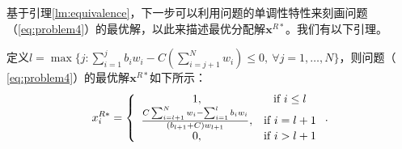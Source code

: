 	基于引理\ref{lm:equivalence}，下一步可以利用问题的单调性特性来刻画问题（\ref{eq:problem4}）的最优解，以此来描述最优分配解$\mathbf{x}^{R*}$。我们有以下引理。
	\begin{lm}\label{lm:optx}
		定义$l=\max\{j:\sum_{i=1}^{j}b_iw_i-C(\sum_{i=j+1}^{N}w_i)\le 0,~\forall j=1,\dots,N\}$，则问题（ \ref{eq:problem4}）的最优解$\mathbf{x}^{R*}$如下所示：
		\begin{equation}\label{eq:xR}
		x_i^{R*}=\left\{
		\begin{array}{*{20}c}
		1, & \text{if}~i\le l  \\
		\frac{C\sum_{i=l+1}^N w_i-\sum_{i=1}^l b_iw_i}{(b_{l+1}+C)w_{l+1}}, & {\text{if}~i=l+1}  \\
		0, & \text{if}~i>l+1
		\end{array} \right..
		\end{equation}
	\end{lm}
